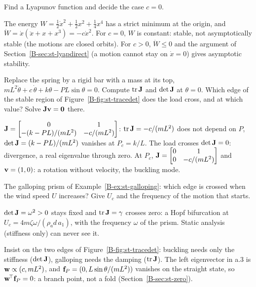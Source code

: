 \q Find a Lyapunov function and decide the case $c = 0$.
\begin{answer}
The energy $W = \tfrac12\dot x^2 + \tfrac12x^2 + \tfrac14x^4$ has a strict minimum at
the origin, and $\dot W = \dot x(\ddot x + x + x^3) = -c\dot x^2$. For $c = 0$,
$W$ is constant: stable, not asymptotically stable (the motions are closed orbits).
For $c > 0$, $\dot W \le 0$ and the argument of Section~\ref{B-sec:st-lyapdirect}
(a motion cannot stay on $\dot x = 0$) gives asymptotic stability.
\end{answer}

\q Replace the spring by a rigid bar with a mass at its top,
$mL^2\ddot\theta + c\,\dot\theta + k\theta - PL\sin\theta = 0$. Compute
$\operatorname{tr}\mathbf{J}$ and $\det\mathbf{J}$ at $\theta = 0$. Which edge of the stable region of
Figure~\ref{B-fig:st-tracedet} does the load cross, and at which value? Solve
$\mathbf{J}\mathbf{v} = \mathbf{0}$ there.
\begin{answer}
$\mathbf{J} = \begin{bmatrix} 0 & 1\\ -(k - PL)/(mL^2) & -c/(mL^2)\end{bmatrix}$:
$\operatorname{tr}\mathbf{J} = -c/(mL^2)$ does not depend on $P$, $\det\mathbf{J} = (k - PL)/(mL^2)$
vanishes at $P_c = k/L$. The load crosses $\det\mathbf{J} = 0$: divergence, a real
eigenvalue through zero. At $P_c$, $\mathbf{J} = \begin{bmatrix} 0 & 1\\ 0 & -c/(mL^2)\end{bmatrix}$
and $\mathbf{v} = (1,0)$: a rotation without velocity, the buckling mode.
\end{answer}

\q The galloping prism of Example~\ref{B-ex:st-galloping}: which edge is crossed when
the wind speed $U$ increases? Give $U_c$ and the frequency of the motion that starts.
\begin{answer}
$\det\mathbf{J} = \omega^2 > 0$ stays fixed and $\operatorname{tr}\mathbf{J} = \gamma$ crosses zero: a Hopf
bifurcation at $U_c = 4m\zeta\omega/(\rho_a d\,a_1)$, with the frequency $\omega$ of the
prism. Static analysis (stiffness only) can never see it.
\end{answer}

\begin{instructor}
Insist on the two edges of Figure~\ref{B-fig:st-tracedet}: buckling needs only the
stiffness ($\det\mathbf{J}$), galloping needs the damping ($\operatorname{tr}\mathbf{J}$). The left
eigenvector in a.3 is $\mathbf{w} \propto (c, mL^2)$, and $\mathbf{f}_P = (0, L\sin\theta/(mL^2))$
vanishes on the straight state, so $\mathbf{w}^{\!\top}\mathbf{f}_P = 0$: a branch point, not a fold
(Section~\ref{B-sec:st-zero}).
\end{instructor}

